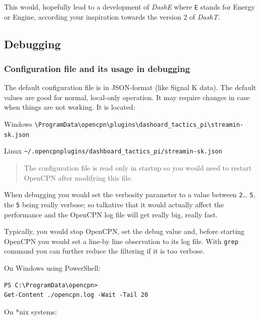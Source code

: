 \documentclass[11pt]{article}
\begin{document}
    This would, hopefully lead to a development of \emph{DashE} where
\texttt{E} stands for Energy or Engine, according your inspiration
towards the version 2 of \emph{DashT}.

    \hypertarget{debugging}{%
\subsection{Debugging}\label{debugging}}

    \hypertarget{configuration-file-and-its-usage-in-debugging}{%
\subsubsection{Configuration file and its usage in
debugging}\label{configuration-file-and-its-usage-in-debugging}}

    The default configuration file is in JSON-format (like Signal K data).
The default values are good for normal, local-only operation. It may
require changes in case when things are not working. It is located:

    Windows
\texttt{\textbackslash{}ProgramData\textbackslash{}opencpn\textbackslash{}plugins\textbackslash{}dashoard\_tactics\_pi\textbackslash{}streamin-sk.json}

    Linux
\texttt{\textasciitilde{}/.opencpnplugins/dashboard\_tactics\_pi/streamin-sk.json}

    \begin{quote}
The configuration file is read only in startup so you would need to
restart OpenCPN after modifying this file.
\end{quote}

    When debugging you would set the verbosity parameter to a value between
\texttt{2}\ldots{} \texttt{5}, the \texttt{5} being really verbose; so
talkative that it would actually affect the performance and the OpenCPN
log file will get really big, really fast.

    Typically, you would stop OpenCPN, set the debug value and, before
starting OpenCPN you would set a line-by line observation to its log
file. With \texttt{grep} command you can further reduce the filtering if
it is too verbose.

    On Windows using PowerShell:

\begin{verbatim}
PS C:\ProgramData\opencpn>
Get-Content ./opencpn.log -Wait -Tail 20
\end{verbatim}

    On *nix systems:
\end{document}

